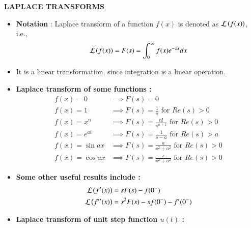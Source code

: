 \documentclass[journal]{IEEEtran}
\begin{document}
\textbf{LAPLACE TRANSFORMS} \\
\begin{itemize}
	\item \textbf{Notation} : Laplace transform of a function $f(x)$ is denoted as $\mathcal{L} \left(f(x)\right)$, i.e., 
		\begin{align}
			\mathcal{L} \left(f(x)\right) = F(s) = \int_{0}^{\infty} f(x) e^{-sx} dx \label{eq:lap} 
		\end{align}
	\item It is a linear transformation, since integration is a linear operation.
	\item \textbf{Laplace transform of some functions :} 
		\begin{align}
			f(x) = 0 &\implies F(s) = 0 \\
			f(x) = 1 &\implies F(s) = \frac{1}{s} \text{ for } Re(s) > 0\\
			f(x) = x^n &\implies F(s) = \frac{n!}{s^{n+1}} \text{ for } Re(s) > 0 \\
			f(x) = e^{at} &\implies F(s) = \frac{1}{s-a} \text{ for } Re(s) > a \\
			f(x) = \sin{ax} &\implies F(s) = \frac{a}{s^2 + a^2} \text{ for } Re(s) > 0 \\
			f(x) = \cos{ax} &\implies F(s) = \frac{s}{s^2 + a^2} \text{ for } Re(s) > 0
		\end{align}
	\item \textbf{Some other useful results include :}
		\begin{align}
			\mathcal{L} \left(f^{\prime}(x)\right) &= s F(s) - f(0^{-}) \\
			\mathcal{L} \left(f^{\prime \prime}(x)\right) &= s^2 F(s) - s f(0^{-}) - f^{\prime}(0^{-}) 
		\end{align}
	\item \textbf{Laplace transform of unit step function $u(t)$ :} \\

\end{itemize}
\end{document}
